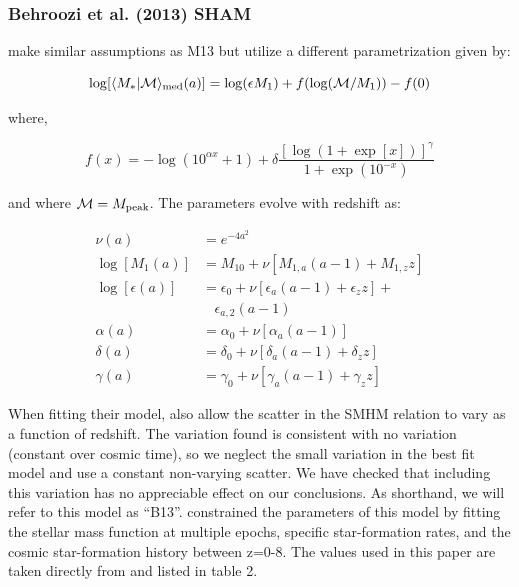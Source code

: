 \documentclass[a4paper,fleqn,usenatbib]{mnras}
\begin{document}
\subsubsection{Behroozi et al. (2013) SHAM}
\label{sec:b13}

\citet{Behroozi:2013fg} make similar assumptions as M13 but utilize a different parametrization given by:
%
\begin{linenomath}
\begin{equation}
\log[\langle M_*|\mathcal{M} \rangle_{\rm med}(a)] = \log(\epsilon M_1) + f(\log(\mathcal{M}/M_1)) - f(0)
\end{equation}
\end{linenomath}
%
where,
% 
\begin{linenomath}
\begin{equation}
f(x) = -\log(10^{\alpha x}+1) + \delta\frac{\left[ \log(1+\exp[x])\right]^{\gamma}}{1+\exp(10^{-x})}
\end{equation}
\end{linenomath}
%
and where $\mathcal{M} = M_{\rm peak}$.  The parameters evolve with redshift as:
%
\begin{linenomath}
\begin{align}
\nu(a) & = e^{-4a^2}  \\
\log[M_1(a)] & =  M_{10} + \nu\left[ M_{1,a}(a-1) + M_{1,z}z \right] \\
\log[\epsilon(a)] & = \epsilon_0 + \nu \left[\epsilon_a(a-1) +\epsilon_z z\right] + \\ \nonumber 
& ~~~~ \epsilon_{a,2}(a-1)  \\
\alpha(a) & =  \alpha_{0} + \nu\left[ \alpha_a(a-1)\right] \\
\delta(a) & =   \delta_{0} + \nu\left[ \delta_a(a-1) + \delta_z z\right] \\
\gamma(a) &= \gamma_{0} + \nu\left[ \gamma_a(a-1) + \gamma_z z\right]
\end{align}
\end{linenomath}
% 
When fitting their model, \cite{Behroozi:2013fg} also allow the scatter in the SMHM relation to vary as a function of redshift.  The variation found is consistent with no variation (constant over cosmic time), so we neglect the small variation in the best fit model and use a constant non-varying scatter.  We have checked that including this variation has no appreciable effect on our conclusions.   As shorthand, we will refer to this model as ``B13''.   \cite{Behroozi:2013fg} constrained the parameters of this model by fitting the stellar mass function at multiple epochs, specific star-formation rates, and the cosmic star-formation history between z=0-8.  The values used in this paper are taken directly from \cite{Behroozi:2013fg} and listed in table 2.
\end{document}

